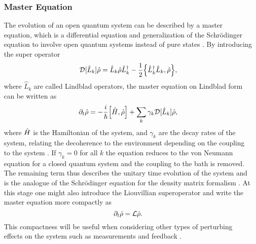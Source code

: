 \subsubsection{Master Equation}\label{sec:mastereq}
The evolution of an open quantum system can be described by a master equation, which is a differential equation and generalization of the Schrödinger equation to involve open quantum systems instead of pure states \cite{Annby-Andersson:2024}. By introducing the super operator
\begin{equation}
    \super{\hat{L}_k}\dmatrix = \hat{L}_k\dmatrix\hat{L}_k^{\dagger} - \frac{1}{2} \acomm{\hat{L}_k^\dagger \hat{L}_k}{\dmatrix},
\end{equation} 
where $\hat{L}_k$ are called Lindblad operators, the master equation on Lindblad form can be written as 
\begin{equation}
    \dt\dmatrix = -\frac{i}{\hbar}\comm{\hamiltonian}{\dmatrix} + \sum_k \gamma_k\super{\hat{L}_k}\dmatrix,
\end{equation}
where $\hat{H}$ is the Hamiltonian of the system, and $\gamma_k$ are the decay rates of the system, relating the decoherence to the environment depending on the coupling to the system \cite{Annby-Andersson:2024}. If $\gamma_k = 0$ for all $k$ the equation reduces to the von Neumann equation for a closed quantum system and the coupling to the bath is removed. The remaining term thus describes the unitary time evolution of the system and is the analogue of the Schrödinger equation for the density matrix formalism \cite{Annby-Andersson:2024}. At this stage one might also introduce the Liouvillian superoperator and write the master equation more compactly as
\begin{equation}
    \partial_t\hat{\rho} = \mathcal{L}\hat{\rho}.
\end{equation}
This compactness will be useful when considering other types of perturbing effects on the system such as measurements and feedback \cite{Annby-Andersson:2024}.

